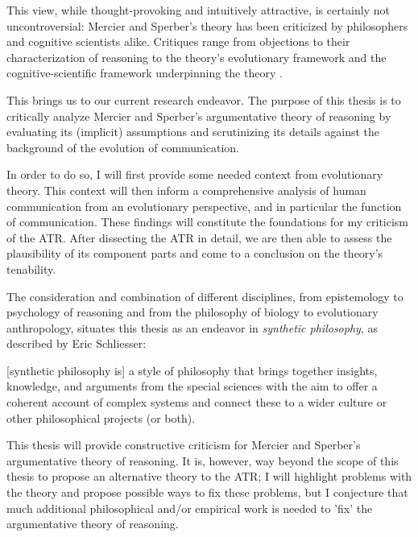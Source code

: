 This view, while thought-provoking and intuitively attractive, is certainly not uncontroversial: Mercier and Sperber's theory has been criticized by philosophers and cognitive scientists alike. Critiques range from objections to their characterization of reasoning \citep{Koren23} to the theory's evolutionary framework \citep{Novaes18} and the cognitive-scientific framework underpinning the theory \citep{Sterelny18, Chater18}.


This brings us to our current research endeavor.
The purpose of this thesis is to critically analyze Mercier and Sperber's argumentative theory of reasoning by evaluating its (implicit) assumptions and scrutinizing its details against the background of the evolution of communication.

In order to do so, I will first provide some needed context from evolutionary theory. This context will then inform a comprehensive analysis of human communication from an evolutionary perspective, and in particular the function of communication. These findings will constitute the foundations for my criticism of the ATR.
After dissecting the ATR in detail, we are then able to assess the plausibility of its component parts and come to a conclusion on the theory's tenability.

The consideration and combination of different disciplines, from epistemology to psychology of reasoning and from the philosophy of biology to evolutionary anthropology,
situates this thesis as an endeavor in \emph{synthetic philosophy}, as described by Eric Schliesser:
\begin{quoting}
    {[synthetic philosophy is]} a style of philosophy that brings together insights, knowledge, and arguments from the special sciences with the aim to offer a coherent account of complex systems and connect these to a wider culture or other philosophical projects (or both).
    \hfill \citep[pp.~1--2]{Schliesser19}
\end{quoting}

This thesis will provide constructive criticism for Mercier and Sperber's argumentative theory of reasoning. It is, however, way beyond the scope of this thesis to propose an alternative theory to the ATR; I will highlight problems with the theory and propose possible ways to fix these problems, but I conjecture that much additional philosophical and/or empirical work is needed to 'fix' the argumentative theory of reasoning.

